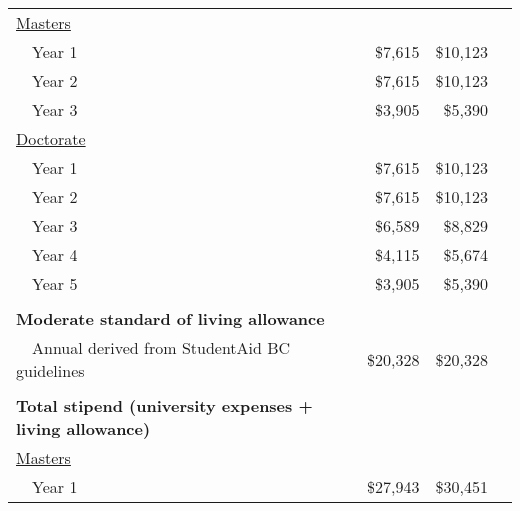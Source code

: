 \documentclass[11pt]{article}
\begin{document}
\begin{center}
\begin{tabular}{lrrr}
		\underline{Masters}                                             &                   &                          \\
		~~Year 1                                                        & \$7,615           & \$10,123                 \\
		~~Year 2                                                        & \$7,615           & \$10,123                 \\
		~~Year 3                                                        & \$3,905           & \$5,390                  \\
		\underline{Doctorate}                                           &                   &                          \\
		~~Year 1                                                        & \$7,615           & \$10,123                 \\
		~~Year 2                                                        & \$7,615           & \$10,123                 \\
		~~Year 3                                                        & \$6,589           & \$8,829                  \\
		~~Year 4                                                        & \$4,115           & \$5,674                  \\
		~~Year 5                                                        & \$3,905           & \$5,390                  \\
		                                                                &                   &                        & \\
		\textbf{Moderate standard of living allowance}                  &                   &                          \\
		~~Annual derived from StudentAid BC guidelines                  & \$20,328          & \$20,328                 \\
		                                                                &                   &                        & \\
		\textbf{Total stipend (university expenses + living allowance)} &                   &                          \\
		\underline{Masters}                                             &                   &                          \\
		~~Year 1                                                        & \$27,943          & \$30,451                 \\

\end{tabular}
\end{center}
\end{document}

